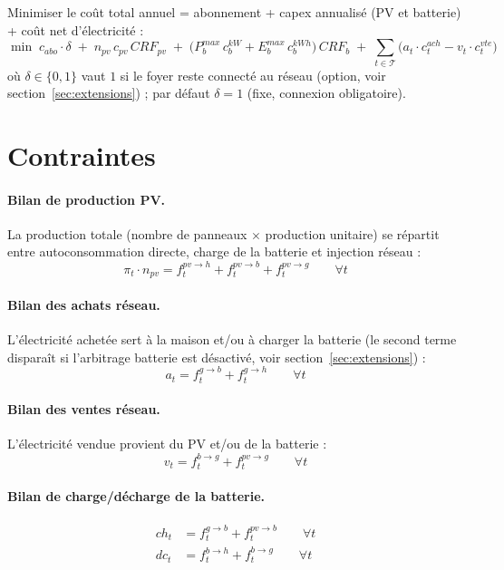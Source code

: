 \documentclass[11pt]{article}
\begin{document}
Minimiser le coût total annuel = abonnement + capex annualisé (PV et batterie) + coût net
d'électricité :
\begin{equation}
\min \; c_{abo} \cdot \delta
\;+\; n_{pv}\, c_{pv}\, CRF_{pv}
\;+\; \big(P^{max}_{b}\, c^{kW}_{b} + E^{max}_{b}\, c^{kWh}_{b}\big)\, CRF_{b}
\;+\; \sum_{t \in \mathcal{T}} \Big( a_t \cdot c^{ach}_t - v_t \cdot c^{vte}_t \Big)
\end{equation}
où $\delta \in \{0,1\}$ vaut $1$ si le foyer reste connecté au réseau (option, voir
section~\ref{sec:extensions}) ; par défaut $\delta = 1$ (fixe, connexion obligatoire).

\section{Contraintes}

\paragraph{Bilan de production PV.} La production totale (nombre de panneaux $\times$
production unitaire) se répartit entre autoconsommation directe, charge de la batterie et
injection réseau :
\begin{equation}
\pi_t \cdot n_{pv} = f^{pv\to h}_t + f^{pv\to b}_t + f^{pv\to g}_t \qquad \forall t
\end{equation}

\paragraph{Bilan des achats réseau.} L'électricité achetée sert à la maison et/ou à
charger la batterie (le second terme disparaît si l'arbitrage batterie est désactivé, voir
section~\ref{sec:extensions}) :
\begin{equation}
a_t = f^{g\to b}_t + f^{g\to h}_t \qquad \forall t
\end{equation}

\paragraph{Bilan des ventes réseau.} L'électricité vendue provient du PV et/ou de la
batterie :
\begin{equation}
v_t = f^{b\to g}_t + f^{pv\to g}_t \qquad \forall t
\end{equation}

\paragraph{Bilan de charge/décharge de la batterie.}
\begin{align}
ch_t &= f^{g\to b}_t + f^{pv\to b}_t \qquad \forall t \\
dc_t &= f^{b\to h}_t + f^{b\to g}_t \qquad \forall t
\end{align}
\end{document}
